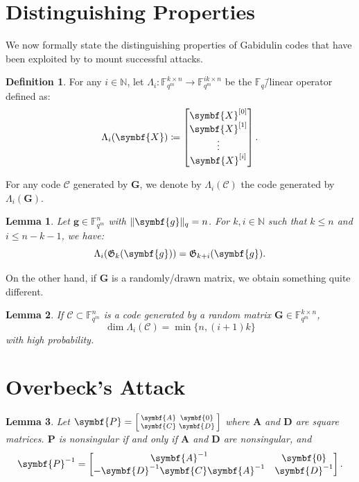 \documentclass[version=last, paper=A4, parskip=half, oneside]{scrbook}
\theoremstyle{plain}
\newtheorem{lemma}{Lemma}
\theoremstyle{definition}
\newtheorem{definition}{Definition}
\theoremstyle{remark}
\renewcommand*{\vec}{\symbf}
\newcommand*{\mat}{\symbf}
\newcommand*{\FF}{\ensuremath{\mathbb{F}}}
\newcommand*{\NN}{\ensuremath{\mathbb{N}}}
\newcommand*{\Gab}{\ensuremath{\mathfrak{G}}}
\DeclarePairedDelimiter{\norm}{\lVert}{\rVert}
\newcommand*{\normR}[2]{\ensuremath{\norm{#1}_{#2}}}
\begin{document}
\section{Distinguishing Properties}

We now formally state the distinguishing properties of Gabidulin codes that have
been exploited by \textcite{Ove05, Ove06, Ove08} to mount successful attacks.

\begin{definition}
  For any \(i \in \NN\), let
  \(\Lambda_i\colon \FF_{q^m}^{k \times n} \to \FF_{q^m}^{i k \times n}\) be
  the \(\FF_q\)\=/linear operator defined as:
  \[
    \Lambda_i(\mat{X}) \coloneqq
    \begin{bmatrix}
      \mat{X}^{[0]} \\
      \mat{X}^{[1]} \\
      \vdots \\
      \mat{X}^{[i]}
    \end{bmatrix}\text.
  \]
\end{definition}

For any code \(\mathcal{C}\) generated by \(\mat{G}\), we denote by
\(\Lambda_i(\mathcal{C})\) the code generated by \(\Lambda_i(\mat{G})\).

\begin{lemma}
  Let \(\vec{g} \in \FF_{q^m}^n\) with \(\normR{\vec{g}}{q} = n\).  For
  \(k, i \in \NN\) such that \(k \le n\) and \(i \le n - k - 1\), we have:
  \[
    \Lambda_i(\Gab_k(\vec{g})) = \Gab_{k + i}(\vec{g})\text.
  \]
\end{lemma}

On the other hand, if \(\mat{G}\) is a randomly\-/drawn matrix, we obtain
something quite different.

\begin{lemma}
  If \(\mathcal{C} \subset \FF_{q^m}^n\) is a code generated by a random matrix
  \(\mat{G} \in \FF_{q^m}^{k \times n}\),
  \[
    \dim \Lambda_i(\mathcal{C}) = \min\{n, (i + 1) k\}
  \]
  with high probability.
\end{lemma}

\section{Overbeck's Attack}

\begin{lemma}
  Let
  \(\mat{P} = \begin{bsmallmatrix} \mat{A} & \mat{0} \\ \mat{C} & \mat{D} \end{bsmallmatrix}\)
  where \(\mat{A}\) and \(\mat{D}\) are square matrices.  \(\mat{P}\) is
  nonsingular if and only if \(\mat{A}\) and \(\mat{D}\) are nonsingular, and
  \[
    \mat{P}^{-1} =
    \begin{bmatrix}
      \mat{A}^{-1} & \mat{0} \\
      -\mat{D}^{-1} \mat{C} \mat{A}^{-1} & \mat{D}^{-1}
    \end{bmatrix}\text.
  \]
\end{lemma}
\end{document}
